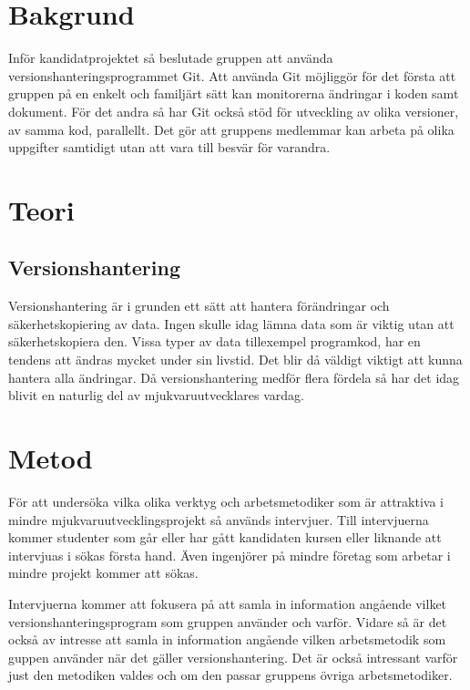 \vspace{1.5em}
\section{Bakgrund}
Inför kandidatprojektet så beslutade gruppen att använda versionshanteringsprogrammet Git. Att använda Git möjliggör för det första att gruppen på en enkelt och familjärt sätt kan monitorerna ändringar i koden samt dokument. För det andra så har Git också stöd för utveckling av olika versioner, av samma kod, parallellt. Det gör att gruppens medlemmar kan arbeta på olika uppgifter samtidigt utan att vara till besvär för varandra.

\vspace{1.5em}
\section{Teori}
  \subsection{Versionshantering}
Versionshantering är i grunden ett sätt att hantera förändringar och säkerhetskopiering av data. Ingen skulle idag lämna data som är viktig utan att säkerhetskopiera den. Vissa typer av data tillexempel programkod, har en tendens att ändras mycket under sin livstid. Det blir då väldigt viktigt att kunna hantera alla ändringar. Då versionshantering medför flera fördela så har det idag blivit en naturlig del av mjukvaruutvecklares vardag. \cite{VersionControlGit}

\vspace{1.5em}
\section{Metod}
För att undersöka vilka olika verktyg och arbetsmetodiker som är attraktiva i mindre mjukvaruutvecklingsprojekt så används intervjuer. Till intervjuerna kommer studenter som går eller har gått kandidaten kursen eller liknande att intervjuas i sökas första hand. Även ingenjörer på mindre företag som arbetar i mindre projekt kommer att sökas.


Intervjuerna kommer att fokusera på att samla in information angående vilket versionshanteringsprogram som gruppen använder och varför. Vidare så är det också av intresse att samla in information angående vilken arbetsmetodik som guppen använder när det gäller versionshantering. Det är också intressant varför just den metodiken valdes och om den passar gruppens övriga arbetsmetodiker.

